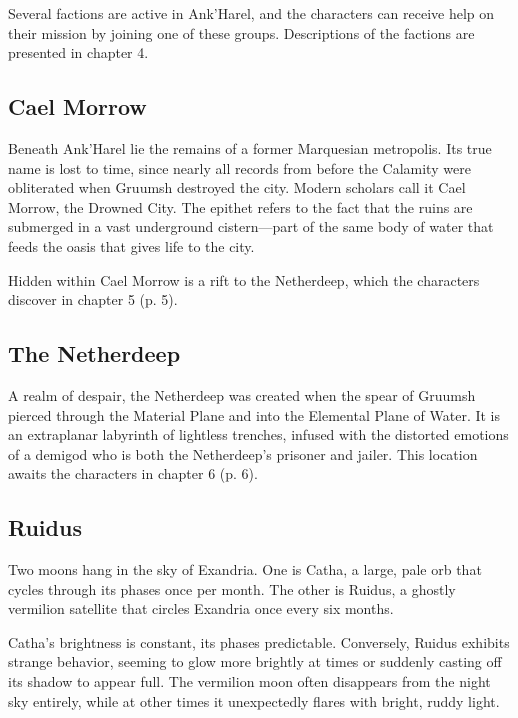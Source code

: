 \documentclass[a4paper, 11pt, bg=full, twocolumn, nooutline]{dndbook}
\begin{document}
Several factions are active in Ank'Harel, and the characters can receive help on their mission by joining one of these groups. Descriptions of the factions are presented in chapter 4.

\subsection{Cael Morrow}

Beneath Ank'Harel lie the remains of a former Marquesian metropolis. Its true name is lost to time, since nearly all records from before the Calamity were obliterated when Gruumsh destroyed the city. Modern scholars call it Cael Morrow, the Drowned City. The epithet refers to the fact that the ruins are submerged in a vast underground cistern---part of the same body of water that feeds the oasis that gives life to the city.

Hidden within Cael Morrow is a rift to the Netherdeep, which the characters discover in chapter 5 (p. 5).

\subsection{The Netherdeep}

A realm of despair, the Netherdeep was created when the spear of Gruumsh pierced through the Material Plane and into the Elemental Plane of Water. It is an extraplanar labyrinth of lightless trenches, infused with the distorted emotions of a demigod who is both the Netherdeep's prisoner and jailer. This location awaits the characters in chapter 6 (p. 6).

\subsection{Ruidus}


Two moons hang in the sky of Exandria. One is Catha, a large, pale orb that cycles through its phases once per month. The other is Ruidus, a ghostly vermilion satellite that circles Exandria once every six months.

Catha's brightness is constant, its phases predictable. Conversely, Ruidus exhibits strange behavior, seeming to glow more brightly at times or suddenly casting off its shadow to appear full. The vermilion moon often disappears from the night sky entirely, while at other times it unexpectedly flares with bright, ruddy light.
\end{document}
